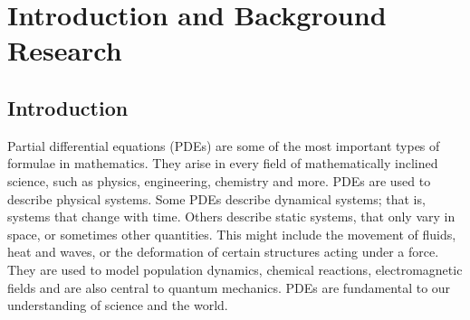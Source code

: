 \chapter{Introduction and Background Research}

\label{chapter1}

\section{Introduction} \label{section:introduction}



Partial differential equations (PDEs) are some of the most important types of formulae in mathematics. They arise in every field of mathematically inclined science, such as physics, engineering, chemistry and more. PDEs are used to describe physical systems. Some PDEs describe dynamical systems; that is, systems that change with time. Others describe static systems, that only vary in space, or sometimes other quantities. This might include the movement of fluids, heat and waves, or the deformation of certain structures acting under a force. They are used to model population dynamics, chemical reactions, electromagnetic fields and are also central to quantum mechanics. PDEs are fundamental to our understanding of science and the world\cite{pde-introduction}.

